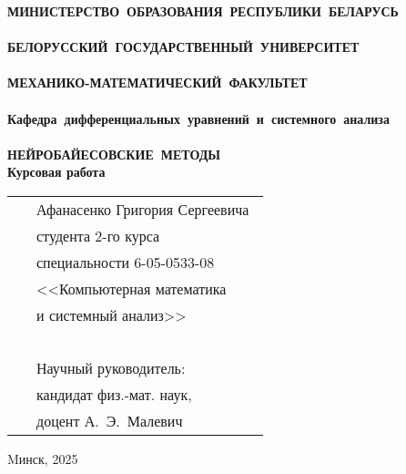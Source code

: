 \setcounter{page}{1}
\thispagestyle{empty}
\begin{center}
\bf
\vspace{4cm}
{
\mbox{МИНИСТЕРСТВО~ОБРАЗОВАНИЯ~РЕСПУБЛИКИ~БЕЛАРУСЬ} \\~\\
\mbox{БЕЛОРУССКИЙ~ГОСУДАРСТВЕННЫЙ~УНИВЕРСИТЕТ} \\~\\
\mbox{МЕХАНИКО-МАТЕМАТИЧЕСКИЙ~ФАКУЛЬТЕТ} \\~\\
\mbox{Кафедра~дифференциальных~уравнений~и~системного~анализа} \\~\\
}
\vspace{4cm}
\bf
\mbox{НЕЙРОБАЙЕСОВСКИЕ МЕТОДЫ}\\
\vspace{1cm}
\rm Курсовая работа
\vspace{3cm}
\end{center}

\begin{tabular}{ll}
\hspace{10.5cm}
&Афанасенко Григория Сергеевича~\\
&студента 2-го курса\\
&специальности 6-05-0533-08\\
&<<Компьютерная математика\\
&и системный анализ>>\\~\\
&Научный руководитель:\\
&кандидат физ.-мат. наук,\\
&доцент А.~Э.~Малевич
\end{tabular}
\vspace{3.9cm}
\begin{center}
    Mинск, 2025
\end{center}
\clearpage
\restoregeometry
